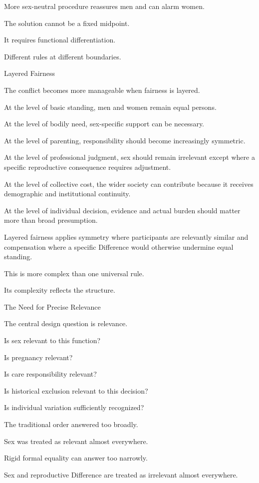 More sex-neutral procedure reassures men and can alarm women.

The solution cannot be a fixed midpoint.

It requires functional differentiation.

Different rules at different boundaries.

Layered Fairness

The conflict becomes more manageable when fairness is layered.

At the level of basic standing, men and women remain equal persons.

At the level of bodily need, sex-specific support can be necessary.

At the level of parenting, responsibility should become increasingly symmetric.

At the level of professional judgment, sex should remain irrelevant except where a specific reproductive consequence requires adjustment.

At the level of collective cost, the wider society can contribute because it receives demographic and institutional continuity.

At the level of individual decision, evidence and actual burden should matter more than broad presumption.

Layered fairness applies symmetry where participants are relevantly similar and compensation where a specific Difference would otherwise undermine equal standing.

This is more complex than one universal rule.

Its complexity reflects the structure.

The Need for Precise Relevance

The central design question is relevance.

Is sex relevant to this function?

Is pregnancy relevant?

Is care responsibility relevant?

Is historical exclusion relevant to this decision?

Is individual variation sufficiently recognized?

The traditional order answered too broadly.

Sex was treated as relevant almost everywhere.

Rigid formal equality can answer too narrowly.

Sex and reproductive Difference are treated as irrelevant almost everywhere.

